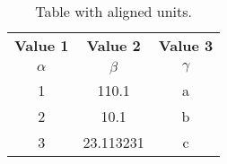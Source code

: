 \documentclass{article}
\begin{document}
\begin{table}[h!]
	\begin{center}
		\caption{Table with aligned units.}
		\label{tab:table1}
		\begin{tabular}{c|c|c} %
			\textbf{Value 1} & \textbf{Value 2} &
			\textbf{Value 3}\\
			$\alpha$ & $\beta$ & $\gamma$ \\
			\hline
			1 & 110.1 & a\\
			2 & 10.1 & b\\
			3 & 23.113231 & c\\
		\end{tabular}
	\end{center}
\end{table}
\end{document}
